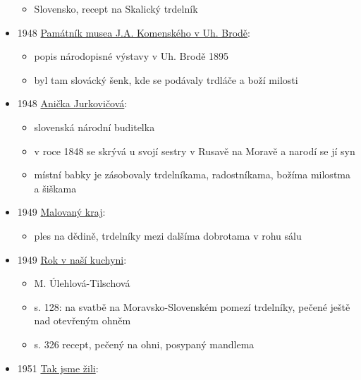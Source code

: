 \begin{itemize}
  \begin{itemize}
  \tightlist
  \item
    Slovensko, recept na Skalický trdelník
  \end{itemize}
\item
  1948
  \href{https://ceskadigitalniknihovna.cz/uuid/uuid:1536d800-488a-11e4-aded-005056827e51}{Památník
  musea J.A. Komenského v Uh. Brodě}:

  \begin{itemize}
  \tightlist
  \item
    popis národopisné výstavy v Uh. Brodě 1895
  \item
    byl tam slovácký šenk, kde se podávaly trdláče a boží milosti
  \end{itemize}
\item
  1948
  \href{https://dikda.snk.sk/uuid/uuid:fe08d509-63e7-4e4f-bf4f-0d9cef56b5a8}{Anička
  Jurkovičová}:

  \begin{itemize}
  \tightlist
  \item
    slovenská národní buditelka
  \item
    v roce 1848 se skrývá u svojí sestry v Rusavě na Moravě a narodí se
    jí syn
  \item
    místní babky je zásobovaly trdelníkama, radostníkama, božíma
    milostma a šiškama
  \end{itemize}
\item
  1949
  \href{https://ceskadigitalniknihovna.cz/uuid/uuid:66097490-f209-11e3-a012-005056825209}{Malovaný
  kraj}:

  \begin{itemize}
  \tightlist
  \item
    ples na dědině, trdelníky mezi dalšíma dobrotama v rohu sálu
  \end{itemize}
\item
  1949
  \href{https://ceskadigitalniknihovna.cz/uuid/uuid:3c65e0dc-eea0-4315-9819-a34d4fe39616}{Rok
  v naší kuchyni}:

  \begin{itemize}
  \tightlist
  \item
    M. Úlehlová-Tilschová
  \item
    s. 128: na svatbě na Moravsko-Slovenském pomezí trdelníky, pečené
    ještě nad otevřeným ohněm
  \item
    s. 326 recept, pečený na ohni, posypaný mandlema
  \end{itemize}
\item
  1951
  \href{https://ceskadigitalniknihovna.cz/view/uuid:20d0de00-02ba-11e5-9506-005056827e51?page=uuid\%3Ad5741950-0ec5-11e5-b562-005056827e51&fulltext=trdlovec*\%20OR\%20trdlovcem&source=mzk}{Tak
  jsme žili}:


\end{itemize}
